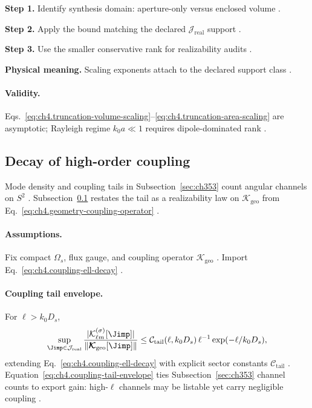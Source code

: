 \textbf{Step 1.} Identify synthesis domain: aperture-only versus enclosed volume \cite{collin2001,stratton1941}.

\textbf{Step 2.} Apply the bound matching the declared \(\mathcal{J}_{\mathrm{real}}\) support \cite{harrington2001,devaney2004}.

\textbf{Step 3.} Use the smaller conservative rank for realizability audits \cite{hansen1988}.

\textbf{Physical meaning.} Scaling exponents attach to the declared support class \cite{stratton1941}.

\paragraph{Validity.}
Eqs.~\eqref{eq:ch4.truncation-volume-scaling}--\eqref{eq:ch4.truncation-area-scaling} are asymptotic; Rayleigh regime \(k_{0}a\ll1\)
requires dipole-dominated rank \cite{jackson1999,hansen1988}.


\subsection{Decay of high-order coupling}
\label{sec:ch463}

Mode density and coupling tails in Subsection~\ref{sec:ch353} count angular channels on \(S^{2}\) \cite{jackson1999,hansen1988}.
Subsection~\ref{sec:ch463} restates the tail as a realizability law on \(\boldsymbol{\mathcal{K}}_{\mathrm{geo}}\) from
Eq.~\eqref{eq:ch4.geometry-coupling-operator} \cite{stratton1941,harrington2001}.

\paragraph{Assumptions.}
Fix compact \(\Omega_{s}\), flux gauge, and coupling operator \(\boldsymbol{\mathcal{K}}_{\mathrm{geo}}\)
\cite{stratton1941,hansen1988}. Import Eq.~\eqref{eq:ch4.coupling-ell-decay} \cite{harrington2001,devaney2004}.

\paragraph{Coupling tail envelope.}
For \(\ell>k_{0}D_{s}\),
\begin{equation}
\label{eq:ch4.coupling-tail-envelope}
\sup_{\Jimp\in\mathcal{J}_{\mathrm{real}}}
\frac{|\mathcal{K}_{\ell m}^{(\sigma)}[\Jimp]|}{\|\boldsymbol{\mathcal{K}}_{\mathrm{geo}}[\Jimp]\|}
\le
\mathcal{C}_{\mathrm{tail}}(\ell,k_{0}D_{s})\,
\ell^{-1}\exp(-\ell/k_{0}D_{s}),
\end{equation}
extending Eq.~\eqref{eq:ch4.coupling-ell-decay} with explicit sector constants \(\mathcal{C}_{\mathrm{tail}}\)
\cite{hansen1988,stratton1941,jackson1999}. Equation~\eqref{eq:ch4.coupling-tail-envelope} ties Subsection~\ref{sec:ch353} channel
counts to export gain: high-\(\ell\) channels may be listable yet carry negligible coupling \cite{harrington2001,devaney2004}.

